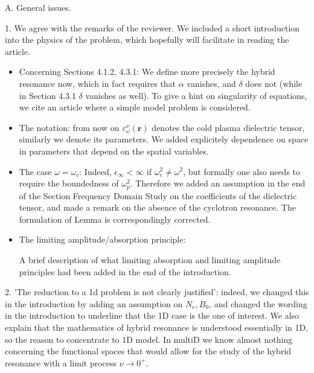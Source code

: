 \documentclass[a4paper,10pt]{article}
\begin{document}

A. General issues.

1. We agree with the remarks of the reviewer. We included a short introduction into the physics of the problem, 
which hopefully will facilitate in reading the article. 
\begin{itemize}
 \item Concerning Sections 4.1.2, 4.3.1: 
We define more precisely the hybrid resonance now, which in fact requires that $\alpha$ vanishes, 
and $\delta$ does not (while in Section 4.3.1 $\delta$ vanishes as well).
To give a hint on singularity of equations, we cite an article where a simple model problem is considered. 

\item 
The notation: 
from now on $\varepsilon^{\nu}_{\omega}(\mathbf{r})$ denotes the cold plasma dielectric tensor, similarly we denote its parameters. 
We added explicitely dependence on space in parameters that depend on the spatial variables. 

\item The case $\omega=\omega_c$:
Indeed, $\epsilon_{\infty}<\infty$ if $\omega_c^2\neq \omega^2$, but formally one also needs to require the boundedness of $\omega_p^2$. Therefore we 
added an assumption in the end of the Section Frequency Domain Study on the coefficients of the dielectric tensor, and made a remark on the absence
of the cyclotron resonance. The formulation of Lemma is correspondingly corrected. 

\item The limiting amplitude/absorption principle: 

A brief description of what limiting absorption and limiting amplitude principles had been added in the end of the introduction.
\end{itemize}


2. 'The reduction to a 1d problem is not clearly justified':  indeed, we changed this in the introduction by adding an assumption on $N_e, B_0$, 
and changed the wording in the introduction to underline that the 1D case is the one of interest. 
We also explain that the mathematics of hybrid resonance is understood essentially
in 1D, so the reason to concentrate to 1D model. In multiD we know almost nothing concerning the functional spaces
that would allow for the   study of the hybrid resonance with a limit process $\nu\rightarrow 0^+$.
\end{document}
